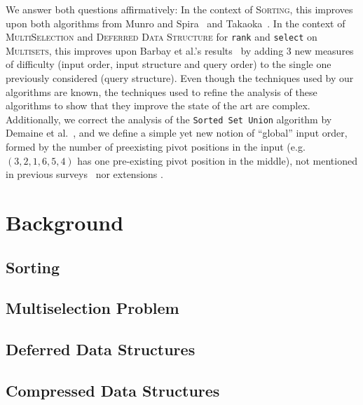 \documentclass[10pt]{article}
\begin{document}
We answer both questions affirmatively: 
%
In the context of \textsc{Sorting}, this improves upon both algorithms from Munro and Spira~\cite{1976-JComp-SortingAndSearchingInMultisets-MunroSpira} and Takaoka~\cite{2009-Chapter-PartialSolutionAndEntropy-Takaoka}. 
%
In the context of \textsc{MultiSelection} and \textsc{Deferred Data
  Structure} for \texttt{rank} and \texttt{select} on
\textsc{Multisets}, this improves upon Barbay et al.'s
results~\cite{2016-JDA-NearOptimalOnlineMultiselectionInInternalAndExternalMemory-BarbayGuptaRaoSorenson}
by adding 3 new measures of difficulty (input order, input structure
and query order) to the single one previously considered (query
structure). Even though the techniques used by our algorithms are
known, the techniques used to refine the analysis of these algorithms
to show that they improve the state of the art are complex.
%
Additionally, 
%
we correct the analysis of the \texttt{Sorted Set Union} algorithm by Demaine et al.~\cite{2000-SODA-AdaptiveSetIntersectionsUnionsAndDifferences-DemaineLopezOrtizMunro}, and
%
we define a simple yet new notion of ``global'' input order, formed by the number of
  preexisting pivot positions in the input (e.g. $(3,2,1,6,5,4)$ has
  one pre-existing pivot position in the middle), not
mentioned in previous
surveys~\cite{1992-ACMCS-ASurveyOfAdaptiveSortingAlgorithms-EstivillCastroWood,1992-ACJ-AnOverviewOfAdaptiveSorting-MoffatPetersson} nor extensions \cite{2013-TCS-OnCompressingPermutationsAndAdaptiveSorting-BarbayNavarro}.

\section{Background}

\subsection{Sorting}

\subsection{Multiselection Problem}

\subsection{Deferred Data Structures}

\subsection{Compressed Data Structures}
\end{document}
